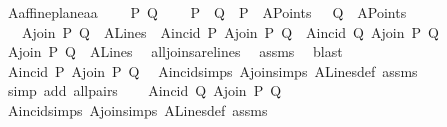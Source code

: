 \begin{isabellebody}
\isanewline
%
\endisadelimproof
\isanewline
{}\isamarkupfalse%
\ A{}affine{\isacharunderscore}{\kern0pt}plane{\isacharunderscore}{\kern0pt}a{}a{\isacharcolon}{\kern0pt}\ \isanewline
\ \ \ P\ Q\isanewline
\ \ \ {\isachardoublequoteopen}\ P\ {\isasymnoteq}\ Q{\isachardoublequoteclose}\ \ {\isachardoublequoteopen}P\ {\isasymin}\ A{}Points{\isachardoublequoteclose}\ \ {\isachardoublequoteopen}\ Q\ {\isasymin}\ A{}Points{\isachardoublequoteclose}\ \isanewline
\ \ \ {\isachardoublequoteopen}A{}join\ P\ Q\ {\isasymin}\ A{}Lines{\isachardoublequoteclose}\ \ {\isachardoublequoteopen}A{}incid\ P\ {\isacharparenleft}{\kern0pt}A{}join\ P\ Q{\isacharparenright}{\kern0pt}{\isachardoublequoteclose}\ \ {\isachardoublequoteopen}A{}incid\ Q\ {\isacharparenleft}{\kern0pt}A{}join\ P\ Q{\isacharparenright}{\kern0pt}{\isachardoublequoteclose}\isanewline
%
\isadelimproof
%
\endisadelimproof
%
\isatagproof
{}\isamarkupfalse%
\ {\isacharminus}{\kern0pt}\isanewline
\ \ \isamarkupfalse%
\ {\isachardoublequoteopen}A{}join\ P\ Q\ {\isasymin}\ A{}Lines{\isachardoublequoteclose}\ \isamarkupfalse%
\ all{\isacharunderscore}{\kern0pt}joins{\isacharunderscore}{\kern0pt}are{\isacharunderscore}{\kern0pt}lines\ \isamarkupfalse%
\ assms\ \isamarkupfalse%
\ blast\isanewline
{}\isamarkupfalse%
\isanewline
\ \ \isamarkupfalse%
\ {\isachardoublequoteopen}A{}incid\ P\ {\isacharparenleft}{\kern0pt}A{}join\ P\ Q{\isacharparenright}{\kern0pt}{\isachardoublequoteclose}\ \isamarkupfalse%
\ A{}incid{\isachardot}{\kern0pt}simps\ A{}join{\isachardot}{\kern0pt}simps\ A{}Lines{\isacharunderscore}{\kern0pt}def\ assms\ \isamarkupfalse%
\ {\isacharparenleft}{\kern0pt}simp\ add{\isacharcolon}{\kern0pt}\ all{\isacharunderscore}{\kern0pt}pairs{\isacharparenright}{\kern0pt}\isanewline
{}\isamarkupfalse%
\isanewline
\ \ \isamarkupfalse%
\ {\isachardoublequoteopen}A{}incid\ Q\ {\isacharparenleft}{\kern0pt}A{}join\ P\ Q{\isacharparenright}{\kern0pt}{\isachardoublequoteclose}\ \isamarkupfalse%
\ A{}incid{\isachardot}{\kern0pt}simps\ A{}join{\isachardot}{\kern0pt}simps\ A{}Lines{\isacharunderscore}{\kern0pt}def\ assms\ \isamarkupfalse%

\end{isabellebody}
